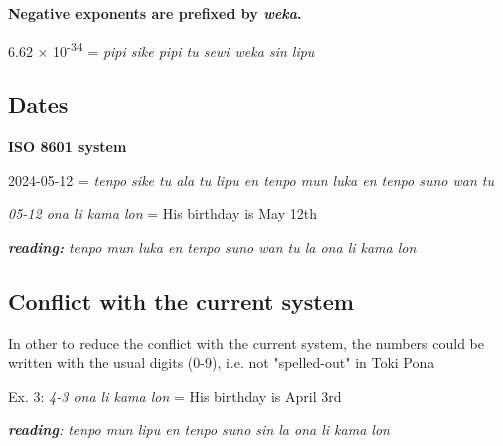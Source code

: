 \documentclass{article}
\begin{document}
	\textbf{Negative exponents are prefixed by \textit{weka}.}

		\vspace{5pt}
	
	6.62 × 10\textsuperscript{-34} = \emph{pipi sike pipi tu sewi weka sin
		lipu}
	
	\subsection{Dates}
	
	\textbf{ISO 8601 system}
	\vspace{5pt}
	
	2024-05-12 = \emph{tenpo sike tu ala tu lipu en tenpo mun luka en tenpo
		suno wan tu}
	
	\vspace{5pt}
	
	
	\emph{05-12 ona li kama lon} = His birthday is May 12th
	
	\vspace{5pt}
	
	\emph{\textbf{reading:} tenpo mun luka en tenpo suno wan tu la ona li kama lon}

	\vspace{5pt}
	
	{\huge{}}
	
	
	\subsection{Conflict with the current system}

\vspace{5pt}


In other to reduce the conflict with the current system, the numbers could be written with the usual digits (0-9), i.e. not "spelled-out" in Toki Pona

	\vspace{5pt}

Ex. 3: \emph{4-3 ona li kama lon} = His birthday is April 3rd

\emph{\textbf{reading}: tenpo mun lipu en tenpo suno sin la ona li kama lon}

\huge{}
	
	
	
\end{document}
